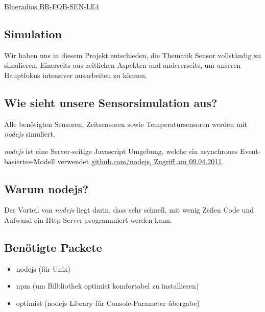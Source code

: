 		\hyperlink{http://www.blueradios.com/hardware_sensors.htm}
		{Blueradios BR-FOB-SEN-LE4}
	\par

\subsection{Simulation}

Wir haben uns in diesem Projekt entschieden, die Thematik Sensor vollständig zu
simulieren. Einerseits aus zeitlichen Aspekten und andererseits, um unseren
Hauptfokus intensiver ausarbeiten zu können.

\subsection{Wie sieht unsere Sensorsimulation aus?} 

Alle benötigten Sensoren, Zeitsensoren sowie Temperatursensoren werden mit
\textit{nodejs} simuliert.

\textit{nodejs} ist eine Server-seitige Javascript
Umgebung, welche ein asynchrones Event-basiertes-Modell
verwendet 
	\hyperlink{https://github.com/joyent/node/wiki}
		{github.com/nodejs, Zugriff am 09.04.2011}.

\subsection{Warum nodejs?}

Der Vorteil von \textit{nodejs} liegt darin, dass sehr schnell, mit wenig
Zeilen Code und Aufwand ein Http-Server programmiert werden kann.


\subsection{Benötigte Packete}
\begin{itemize}
  \item nodejs (für Unix)
  \item npm (um Bilbliothek optimist komfortabel zu installieren)
  \item optimist (nodejs Library für Console-Parameter übergabe)
\end{itemize}
